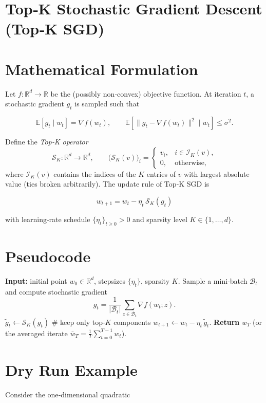 \documentclass{article}
\newcommand{\E}{\mathbb{E}}
\newcommand{\R}{\mathbb{R}}
\newcommand{\cK}{\mathcal{S}_K}
\begin{document}
\section*{Top‑K Stochastic Gradient Descent (Top‑K SGD)}

\section*{Mathematical Formulation}
Let $f:\R^{d}\rightarrow\R$ be the (possibly non‑convex) objective function.  
At iteration $t$, a stochastic gradient $g_t$ is sampled such that  

\[
\E\!\left[g_t\mid w_t\right]=\nabla f(w_t),\qquad 
\E\!\left[\|g_t-\nabla f(w_t)\|^{2}\mid w_t\right]\le\sigma^{2}.
\]

Define the \emph{Top‑K operator}
\[
\cK:\R^{d}\rightarrow\R^{d},\qquad 
\big(\cK(v)\big)_i=
\begin{cases}
v_i, & i\in\mathcal{I}_K(v),\\[2mm]
0,   & \text{otherwise},
\end{cases}
\]
where $\mathcal{I}_K(v)$ contains the indices of the $K$ entries of $v$ with largest absolute value (ties broken arbitrarily).  
The update rule of Top‑K SGD is  

\[
\boxed{w_{t+1}=w_t-\eta_t\,\cK(g_t)}\tag{1}
\]

with learning‑rate schedule $\{\eta_t\}_{t\ge0}>0$ and sparsity level $K\in\{1,\dots,d\}$.

\section*{Pseudocode}
\begin{algorithm}[H]
\caption{Top‑K SGD}
\begin{algorithmic}[1]
\STATE \textbf{Input:} initial point $w_0\in\R^{d}$, stepsizes $\{\eta_t\}$, sparsity $K$.
    \STATE Sample a mini‑batch $\mathcal{B}_t$ and compute stochastic gradient 
    \[
    g_t=\frac{1}{|\mathcal{B}_t|}\sum_{z\in\mathcal{B}_t}\nabla f(w_t;z).
    \]
    \STATE $\displaystyle \tilde g_t\gets\cK(g_t)$   \hfill\# keep only top‑$K$ components
    \STATE $w_{t+1}\gets w_t-\eta_t\,\tilde g_t$.
\ENDFOR
\STATE \textbf{Return} $w_T$ (or the averaged iterate $\bar w_T=\frac1T\sum_{t=0}^{T-1}w_t$).
\end{algorithmic}
\end{algorithm}

\section*{Dry Run Example}
Consider the one‑dimensional quadratic  
\end{document}
